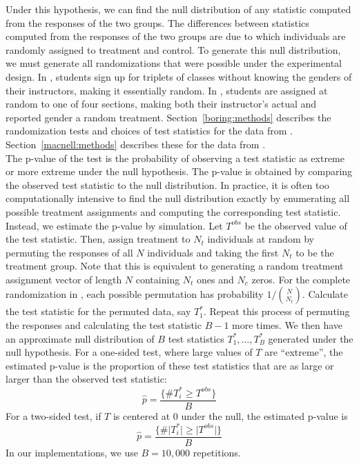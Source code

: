 \documentclass[12pt]{article}
\begin{document}
Under this hypothesis, we can find the null distribution of any statistic computed from the responses of the two groups.  The differences between statistics computed from the responses of the two groups are due to which individuals are randomly assigned to treatment and control.  To generate this null distribution, we must generate all randomizations that were possible under the experimental design.  In \citet{Boring2015}, students sign up for triplets of classes without knowing the genders of their instructors, making it essentially random.  In \citet{MacNell2014}, students are assigned at random to one of four sections, making both their instructor's actual and reported gender a random treatment.  Section~\ref{boring:methods} describes the randomization tests and choices of test statistics for the data from \cite{Boring2015}.  Section~\ref{macnell:methods} describes these for the data from \cite{MacNell2014}. \\

The p-value of the test is the probability of observing a test statistic as extreme or more extreme under the null hypothesis.  The p-value is obtained by comparing the observed test statistic to the null distribution.  In practice, it is often too computationally intensive to find the null distribution exactly by enumerating all possible treatment assignments and computing the corresponding test statistic.  Instead, we estimate the p-value by simulation.  Let $T^{obs}$ be the observed value of the test statistic.  Then, assign treatment to $N_t$ individuals at random by permuting the responses of all $N$ individuals and taking the first $N_t$ to be the treatment group.  Note that this is equivalent to generating a random treatment assignment vector of length $N$ containing $N_t$ ones and $N_c$ zeros.  For the complete randomization in \citet{Boring2015}, each possible permutation has probability $1/{ N \choose N_t}$.  Calculate the test statistic for the permuted data, say $T_1^*$.  Repeat this process of permuting the responses and calculating the test statistic $B-1$ more times.  We then have an approximate null distribution of $B$ test statistics $T_1^*, \dots, T_B^*$ generated under the null hypothesis.  For a one-sided test, where large values of $T$ are ``extreme'', the estimated p-value is the proportion of these test statistics that are as large or larger than the observed test statistic:
$$\hat{p} = \frac{\{ \# T_i^* \geq T^{obs}\}}{B}$$
\noindent For a two-sided test, if $T$ is centered at $0$ under the null, the estimated p-value is
$$\hat{p} = \frac{\{ \# \lvert T_i^*\rvert \geq \lvert T^{obs}\rvert\}}{B}$$
\noindent In our implementations, we use $B = 10,000$ repetitions.\\
\end{document}
